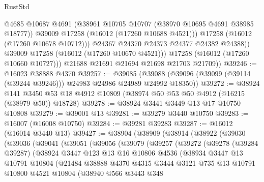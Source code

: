 \begin{lexlean}{RustStd}
\begin{coremodule}
                    @4685
                    @10687
                    @4691
                    (@38961 @10705 @10707 (@38970 @10695 @4691 @38985 @18777))
                    @39009
                    @17258
                    (@16012 (@17260 @10688 @4521)))
                  @17258
                  (@16012 (@17260 @10678 @10712)))
                @24367
                @24370
                @24373
                @24377
                @24382
                @24388))
            @39009
            @17258
            (@16012 (@17260 @10670 @4521)))
          @17258
          (@16012 (@17260 @10660 @10727)))
        @21688
        @21691
        @21694
        @21698
        @21703
        @21709))
@39246 := @16023 @38888 @4370
@39257 := @39085
    (@39088 (@39096 (@39099 (@39114 (@39244 @39246))) @24983 @24986 @24989 @24992 @18350))
@39272 := @38924
    @141
    @3450
    @53
    @18
    @4912
    @10809
    (@38974 @50 @53 @50 @4912 (@16215 (@38979 @50)) @18728)
@39278 := @38924 @3441 @3449 @13 @17 @10750 @10808
@39279 := @39001 @13
@39281 := @39279 @3440 @10750
@39283 := @16007 (@16008 @10750)
@39284 := @39281 @39283
@39287 := @16012 (@16014 @3440 @13)
@39427 := @38904
    (@38909
      (@38914
        (@38922
          (@39030
            (@39036
              (@39041
                (@39051
                  (@39056
                    (@39079
                      (@39257
                        (@39272
                          (@39278
                            (@39284 @39287)
                            (@38924
                              @3447
                              @123
                              @13
                              @16
                              @10806
                              @4536
                              (@38934
                                @3447
                                @13
                                @10791
                                @10804
                                (@21484
                                  @38888
                                  @4370
                                  @4315
                                  @3444
                                  @3121
                                  @735
                                  @13
                                  @10791
                                  @10800
                                  @4521
                                  @10804
                                  (@38940
                                    @566
                                    @3443
                                    @348

\end{coremodule}
\end{lexlean}

